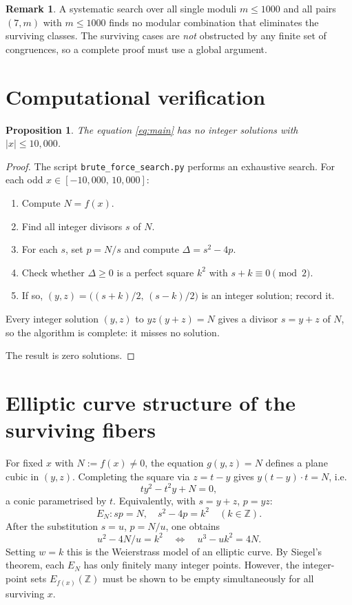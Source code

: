 \documentclass[12pt, a4paper]{article}
\newtheorem{proposition}[theorem]{Proposition}
\theoremstyle{definition}
\newtheorem{remark}[theorem]{Remark}
\newcommand{\Z}{\mathbb{Z}}
\begin{document}
\begin{remark}
A systematic search over all single moduli $m\le1000$ and all
pairs $(7,m)$ with $m\le1000$ finds no modular combination that
eliminates the surviving classes. The surviving cases are
\emph{not} obstructed by any finite set of congruences, so a
complete proof must use a global argument.
\end{remark}

\section{Computational verification}
\label{sec:computation}

\begin{proposition}\label{prop:computational}
The equation \eqref{eq:main} has no integer solutions with $|x|\le10{,}000$.
\end{proposition}

\begin{proof}
The script \texttt{brute\_force\_search.py} performs an exhaustive search.
For each odd $x\in[-10{,}000,\,10{,}000]$:
\begin{enumerate}
  \item Compute $N=f(x)$.
  \item Find all integer divisors $s$ of $N$.
  \item For each $s$, set $p=N/s$ and compute $\Delta=s^2-4p$.
  \item Check whether $\Delta\ge0$ is a perfect square $k^2$ with
        $s+k\equiv0\pmod{2}$.
  \item If so, $(y,z)=\bigl((s+k)/2,\,(s-k)/2\bigr)$ is an integer
        solution; record it.
\end{enumerate}
Every integer solution $(y,z)$ to $yz(y+z)=N$ gives a divisor
$s=y+z$ of $N$, so the algorithm is complete: it misses no solution.

The result is zero solutions.
\end{proof}

\section{Elliptic curve structure of the surviving fibers}
\label{sec:ec}

For fixed $x$ with $N:=f(x)\ne0$, the equation $g(y,z)=N$ defines a
plane cubic in $(y,z)$.  Completing the square via $z=t-y$ gives
$y(t-y)\cdot t=N$, i.e.\
\[
  t y^2 - t^2 y + N = 0,
\]
a conic parametrised by $t$.  Equivalently, with $s=y+z$, $p=yz$:
\[
  E_N\colon sp = N, \quad s^2-4p = k^2 \quad (k\in\Z).
\]
After the substitution $s=u$, $p=N/u$, one obtains
\[
  u^2 - 4N/u = k^2 \quad\Longleftrightarrow\quad u^3 - u k^2 = 4N.
\]
Setting $w=k$ this is the Weierstrass model of an elliptic curve.
By Siegel's theorem, each $E_N$ has only finitely many integer points.
However, the integer-point sets $E_{f(x)}(\Z)$ must be shown to be
empty simultaneously for all surviving $x$.
\end{document}
